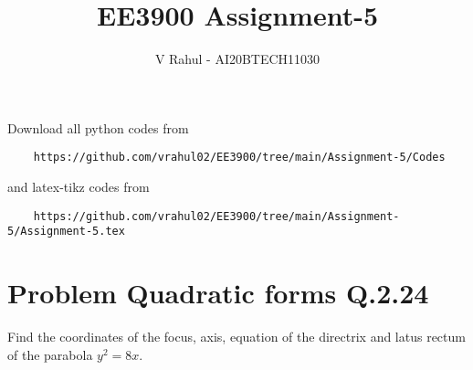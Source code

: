 \documentclass[journal,12pt,twocolumn]{IEEEtran}
\begin{document}
\title{EE3900 Assignment-5}
\author{V Rahul - AI20BTECH11030}
\maketitle
\newpage
\bigskip
\renewcommand{\thefigure}{\theenumi}
\renewcommand{\thetable}{\theenumi}
Download all python codes from 
\begin{lstlisting}
    https://github.com/vrahul02/EE3900/tree/main/Assignment-5/Codes
\end{lstlisting}
%
and latex-tikz codes from 
%
\begin{lstlisting}
    https://github.com/vrahul02/EE3900/tree/main/Assignment-5/Assignment-5.tex
\end{lstlisting}
\section*{Problem Quadratic forms Q.2.24}
Find the coordinates of the focus, axis, equation of the directrix and latus rectum of the parabola $y^2=8x$.\\
\end{document}
